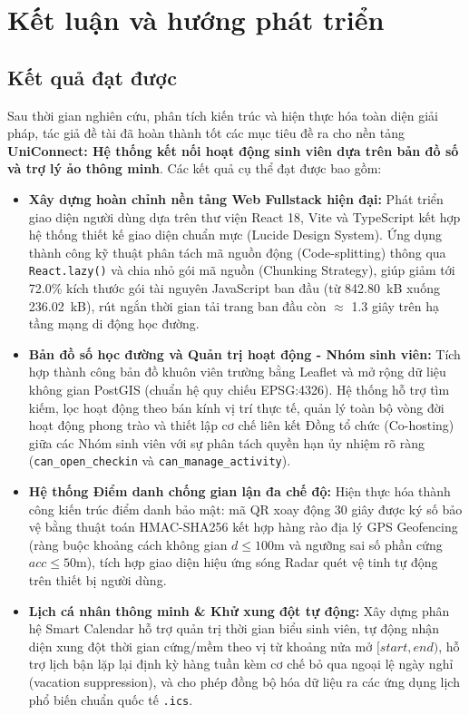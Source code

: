 \section{Kết luận và hướng phát triển}

\subsection{Kết quả đạt được}
Sau thời gian nghiên cứu, phân tích kiến trúc và hiện thực hóa toàn diện giải pháp, tác giả đề tài đã hoàn thành tốt các mục tiêu đề ra cho nền tảng \textbf{UniConnect: Hệ thống kết nối hoạt động sinh viên dựa trên bản đồ số và trợ lý ảo thông minh}. Các kết quả cụ thể đạt được bao gồm:

\begin{itemize}[leftmargin=*]
    \item \textbf{Xây dựng hoàn chỉnh nền tảng Web Fullstack hiện đại:} Phát triển giao diện người dùng dựa trên thư viện React 18, Vite và TypeScript kết hợp hệ thống thiết kế giao diện chuẩn mực (Lucide Design System). Ứng dụng thành công kỹ thuật phân tách mã nguồn động (Code-splitting) thông qua \texttt{React.lazy()} và chia nhỏ gói mã nguồn (Chunking Strategy), giúp giảm tới 72.0\% kích thước gói tài nguyên JavaScript ban đầu (từ 842.80~kB xuống 236.02~kB), rút ngắn thời gian tải trang ban đầu còn $\approx$ 1.3 giây trên hạ tầng mạng di động học đường.
    
    \item \textbf{Bản đồ số học đường và Quản trị hoạt động - Nhóm sinh viên:} Tích hợp thành công bản đồ khuôn viên trường bằng Leaflet và mở rộng dữ liệu không gian PostGIS (chuẩn hệ quy chiếu EPSG:4326). Hệ thống hỗ trợ tìm kiếm, lọc hoạt động theo bán kính vị trí thực tế, quản lý toàn bộ vòng đời hoạt động phong trào và thiết lập cơ chế liên kết Đồng tổ chức (Co-hosting) giữa các Nhóm sinh viên với sự phân tách quyền hạn ủy nhiệm rõ ràng (\texttt{can\_open\_checkin} và \texttt{can\_manage\_activity}).
    
    \item \textbf{Hệ thống Điểm danh chống gian lận đa chế độ:} Hiện thực hóa thành công kiến trúc điểm danh bảo mật: mã QR xoay động 30 giây được ký số bảo vệ bằng thuật toán HMAC-SHA256 kết hợp hàng rào địa lý GPS Geofencing (ràng buộc khoảng cách không gian $d \le 100$m và ngưỡng sai số phần cứng $acc \le 50$m), tích hợp giao diện hiệu ứng sóng Radar quét vệ tinh tự động trên thiết bị người dùng.
    
    \item \textbf{Lịch cá nhân thông minh \& Khử xung đột tự động:} Xây dựng phân hệ Smart Calendar hỗ trợ quản trị thời gian biểu sinh viên, tự động nhận diện xung đột thời gian cứng/mềm theo vị từ khoảng nửa mở $[start, end)$, hỗ trợ lịch bận lặp lại định kỳ hàng tuần kèm cơ chế bỏ qua ngoại lệ ngày nghỉ (vacation suppression), và cho phép đồng bộ hóa dữ liệu ra các ứng dụng lịch phổ biến chuẩn quốc tế \texttt{.ics}.
    

\end{itemize}
